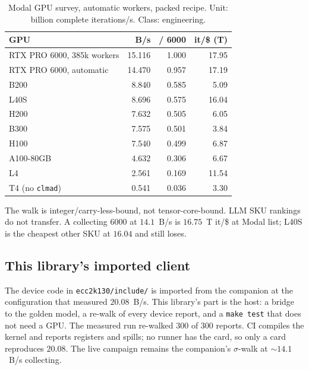 \begin{table}[t]
\centering
\small
\caption{Modal GPU survey, automatic workers, packed recipe. Unit:
  billion complete iterations/s. Class: engineering.}
\label{tab:survey}
\begin{tabular}{@{}lrrr@{}}
\toprule
GPU & B/s & / 6000 & it/\$ (T) \\
\midrule
RTX PRO 6000, 385k workers & 15.116 & 1.000 & 17.95 \\
RTX PRO 6000, automatic & 14.470 & 0.957 & 17.19 \\
B200 & 8.840 & 0.585 & 5.09 \\
L40S & 8.696 & 0.575 & 16.04 \\
H200 & 7.632 & 0.505 & 6.05 \\
B300 & 7.575 & 0.501 & 3.84 \\
H100 & 7.540 & 0.499 & 6.87 \\
A100-80GB & 4.632 & 0.306 & 6.67 \\
L4 & 2.561 & 0.169 & 11.54 \\
T4 (no \texttt{clmad}) & 0.541 & 0.036 & 3.30 \\
\bottomrule
\end{tabular}
\end{table}

The walk is integer/carry-less-bound, not tensor-core-bound. LLM SKU
rankings do not transfer. A collecting 6000 at $14.1$~B/s is $16.75$~T
it/\$ at Modal list; L40S is the cheapest other SKU at $16.04$ and
still loses.

\subsection{This library's imported client}

The device code in \texttt{ecc2k130/include/} is imported from the
companion at the configuration that measured $20.08$~B/s. This
library's part is the host: a bridge to the golden model, a re-walk of
every device report, and a \texttt{make test} that does not need a
GPU. The measured run re-walked $300$ of $300$ reports. CI compiles
the kernel and reports registers and spills; no runner has the card,
so only a card reproduces $20.08$. The live campaign remains the
companion's $\sigma$-walk at $\sim 14.1$~B/s collecting.

